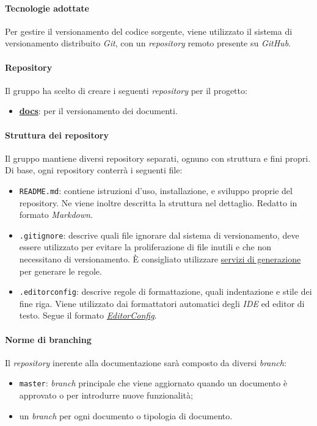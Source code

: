 		\paragraph*{Tecnologie adottate}
		\aCapo{}  
			Per gestire il versionamento del codice sorgente, viene utilizzato il sistema di versionamento distribuito \emph{Git}, con un \emph{repository} remoto presente su \emph{GitHub}.
			
		\paragraph*{Repository}
		\aCapo{}
			Il gruppo \teamname{} ha scelto di creare i seguenti \emph{repository} per il progetto:
			\begin{itemize}
				\item \href{https://github.com/Bug-s-Bunny-Team/docs}{\textbf{docs}}: per il versionamento dei documenti.
			\end{itemize}

		\paragraph*{Struttura dei repository} %
		\aCapo{}  
		Il gruppo mantiene diversi repository separati, ognuno con struttura e fini propri.
		Di base, ogni repository conterrà i seguenti file:
		\begin{itemize}
			\item \verb#README.md#: contiene istruzioni d'uso, installazione, e sviluppo proprie del repository. Ne viene inoltre descritta la struttura nel dettaglio. Redatto in formato \textit{Markdown}.
			\item \verb#.gitignore#: descrive quali file ignorare dal sistema di versionamento, deve essere utilizzato per evitare la proliferazione di file inutili e che non necessitano di versionamento. È consigliato utilizzare \href{https://www.toptal.com/developers/gitignore}{servizi di generazione} per generare le regole.
			\item \verb#.editorconfig#: descrive regole di formattazione, quali indentazione e stile dei fine riga. Viene utilizzato dai formattatori automatici degli \textit{IDE} ed editor di testo. Segue il formato \href{https://editorconfig.org/}{\textit{EditorConfig}}.
		\end{itemize}

		\paragraph*{Norme di branching}
		\aCapo{}  
			Il \emph{repository} inerente alla documentazione sarà composto da diversi \textit{branch}:
			\begin{itemize}
				\item \verb#master#: \emph{branch} principale che viene aggiornato quando un documento è approvato o per introdurre nuove funzionalità; 
				\item un \textit{branch} per ogni documento o tipologia di documento.
			\end{itemize}
		

